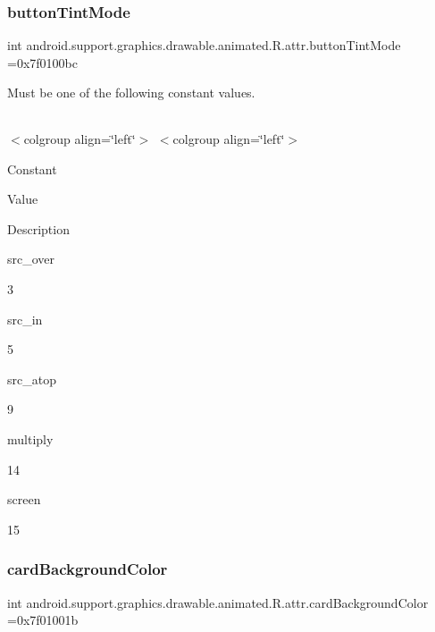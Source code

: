 \subsubsection{\texorpdfstring{button\+Tint\+Mode}{buttonTintMode}}
{\footnotesize\ttfamily int android.\+support.\+graphics.\+drawable.\+animated.\+R.\+attr.\+button\+Tint\+Mode =0x7f0100bc\hspace{0.3cm}{\ttfamily [static]}}

Must be one of the following constant values.

\tabulinesep=1mm
\begin{longtabu} spread 0pt [c]{*{0}{|X[-1]}|}
\hline
\end{longtabu}
$<$colgroup align=\char`\"{}left\char`\"{}$>$ $<$colgroup align=\char`\"{}left\char`\"{}$>$ 

Constant

Value

Description 

{\ttfamily src\+\_\+over}

3

{\ttfamily src\+\_\+in}

5

{\ttfamily src\+\_\+atop}

9

{\ttfamily multiply}

14

{\ttfamily screen}

15\mbox{\label{classandroid_1_1support_1_1graphics_1_1drawable_1_1animated_1_1R_1_1attr_a169408e08b92ac7a63bc70a994c59ab7}} 
\subsubsection{\texorpdfstring{card\+Background\+Color}{cardBackgroundColor}}
{\footnotesize\ttfamily int android.\+support.\+graphics.\+drawable.\+animated.\+R.\+attr.\+card\+Background\+Color =0x7f01001b\hspace{0.3cm}{\ttfamily [static]}}

